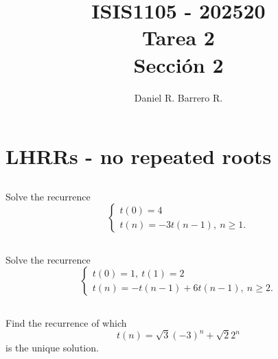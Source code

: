 \documentclass{amsart}
\title{ISIS1105 - 202520\\ Tarea 2\\ Sección 2}
\author{Daniel R. Barrero R.}
\begin{document}
\maketitle

\section{LHRRs - no repeated roots}

%

\subsection{} Solve the recurrence
\begin{displaymath}
	\begin{cases}
		t(0)= 4\\
		t(n)= -3t(n-1),\ n \geq 1.
	\end{cases}
\end{displaymath}

%

\subsection{} Solve the recurrence
\begin{displaymath}
	\begin{cases}
		t(0)= 1,\ t(1)= 2\\
		t(n)= -t(n-1) + 6t(n-1),\ n \geq 2.
	\end{cases}
\end{displaymath}

%

\subsection{} Find the recurrence of which
\[
	t(n)= \sqrt{3}(-3)^n + \sqrt{2}2^n
\]
is the unique solution.
\end{document}
